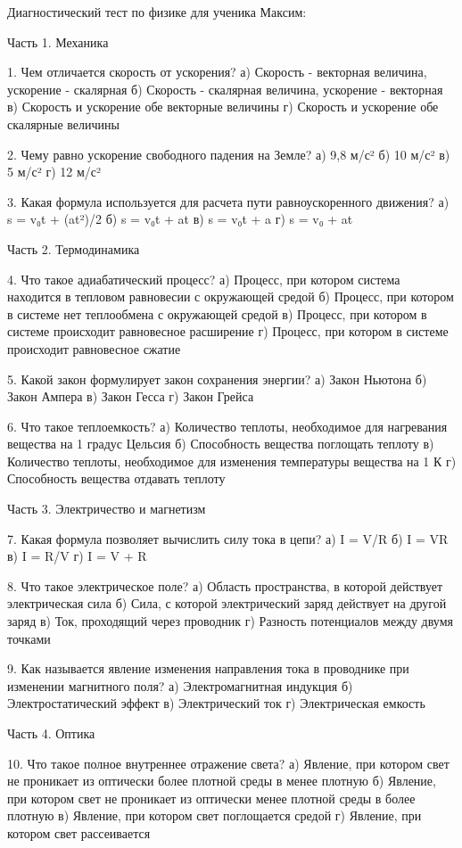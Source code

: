 \documentclass{article}
\begin{document}
Диагностический тест по физике для ученика Максим:

Часть 1. Механика

1. Чем отличается скорость от ускорения?
а) Скорость - векторная величина, ускорение - скалярная
б) Скорость - скалярная величина, ускорение - векторная
в) Скорость и ускорение обе векторные величины
г) Скорость и ускорение обе скалярные величины

2. Чему равно ускорение свободного падения на Земле?
а) 9,8 м/с²
б) 10 м/с²
в) 5 м/с²
г) 12 м/с²

3. Какая формула используется для расчета пути равноускоренного движения?
а) s = v₀t + (at²)/2
б) s = v₀t + at
в) s = v₀t + a
г) s = v₀ + at

Часть 2. Термодинамика

4. Что такое адиабатический процесс?
а) Процесс, при котором система находится в тепловом равновесии с окружающей средой
б) Процесс, при котором в системе нет теплообмена с окружающей средой
в) Процесс, при котором в системе происходит равновесное расширение
г) Процесс, при котором в системе происходит равновесное сжатие

5. Какой закон формулирует закон сохранения энергии?
а) Закон Ньютона
б) Закон Ампера
в) Закон Гесса
г) Закон Грейса

6. Что такое теплоемкость?
а) Количество теплоты, необходимое для нагревания вещества на 1 градус Цельсия
б) Способность вещества поглощать теплоту
в) Количество теплоты, необходимое для изменения температуры вещества на 1 К
г) Способность вещества отдавать теплоту

Часть 3. Электричество и магнетизм

7. Какая формула позволяет вычислить силу тока в цепи?
а) I = V/R
б) I = VR
в) I = R/V
г) I = V + R

8. Что такое электрическое поле?
а) Область пространства, в которой действует электрическая сила
б) Сила, с которой электрический заряд действует на другой заряд
в) Ток, проходящий через проводник
г) Разность потенциалов между двумя точками

9. Как называется явление изменения направления тока в проводнике при изменении магнитного поля?
а) Электромагнитная индукция
б) Электростатический эффект
в) Электрический ток
г) Электрическая емкость

Часть 4. Оптика

10. Что такое полное внутреннее отражение света?
а) Явление, при котором свет не проникает из оптически более плотной среды в менее плотную
б) Явление, при котором свет не проникает из оптически менее плотной среды в более плотную
в) Явление, при котором свет поглощается средой
г) Явление, при котором свет рассеивается
\end{document}
